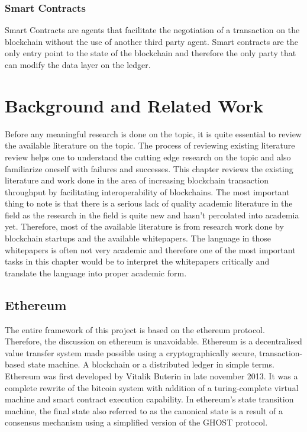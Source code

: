 \documentclass[a4paper,twoside,phd]{BYUPhys}
\begin{document}
\subsection{Smart Contracts}
Smart Contracts are agents that facilitate the negotiation of a transaction on the blockchain without the use of another third party agent. Smart contracts are the only entry point to the state of the blockchain and therefore the only party that can modify the data layer on the ledger.

\chapter{Background and Related Work}
Before any meaningful research is done on the topic, it is quite essential to review the available literature on the topic. The process of reviewing existing literature review helps one to understand the cutting edge research on the topic and also familiarize oneself with failures and successes. This chapter reviews the existing literature and work done in the area of increasing blockchain transaction throughput by facilitating interoperability of blockchains. The most important thing to note is that there is a serious lack of quality academic literature in the field as the research in the field is quite new and hasn't percolated into academia yet. Therefore, most of the available literature is from research work done by blockchain startups and the available whitepapers. The language in those whitepapers is often not very academic and therefore one of the most important tasks in this chapter would be to interpret the whitepapers critically and translate the language into proper academic form.
\section{Ethereum}
The entire framework of this project is based on the ethereum protocol. Therefore, the discussion on ethereum is unavoidable. Ethereum is a decentralised value transfer system made possible using a cryptographically secure, transaction-based state machine. A blockchain or a distributed ledger in simple terms. Ethereum was first developed by Vitalik Buterin in late november 2013. It was a complete rewrite of the bitcoin system with addition of a turing-complete virtual machine and smart contract execution capability. In ethereum's state transition machine, the final state also referred to as the canonical state is a result of a consensus mechanism using a simplified version of the GHOST protocol.
\end{document}
